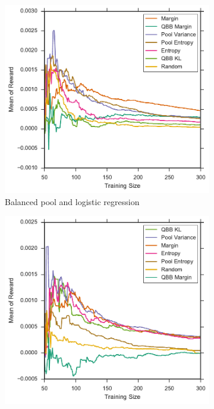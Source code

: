 \begin{figure}[p]
	\centering
	\begin{subfigure}{.5\textwidth}
		\centering
		\includegraphics[width=\textwidth]{figures/5_thompson/sdss_bl_avg_rewards}
		\caption{Balanced pool and logistic regression}
		\label{fig:sdss_bl_avg_rewards}
	\end{subfigure}%
	\begin{subfigure}{.5\textwidth}
		\centering
		\includegraphics[width=\linewidth]{figures/5_thompson/sdss_br_avg_rewards}

\end{subfigure}
\end{figure}

